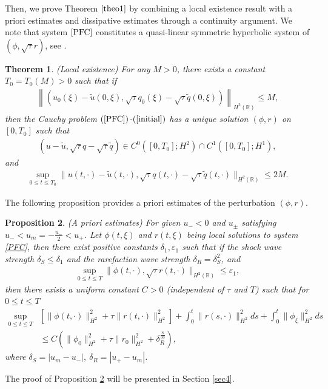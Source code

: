 \documentclass[10pt,reqno]{amsart}
\numberwithin{equation}{section}
\newtheorem{theorem}{Theorem}[section]
\newtheorem{proposition}[theorem]{Proposition}
\begin{document}
	Then, we prove Theorem $\ref{theo1}$ by combining a local existence result with a priori estimates and dissipative estimates through a continuity argument. We note that system $\eqref{PFC}$ constitutes a quasi-linear symmetric hyperbolic system of $\left(\phi,\sqrt{\tau}r\right)$, see \cite{ref40}.
	\begin{theorem}\label{local}
		 (Local existence)
		For any $M>0$, there exists a constant $T_0=T_0(M)>0$ such that if
		\begin{align*}
			\left\lVert\left(u_0(\xi)-\tilde{u}(0,\xi), \sqrt{\tau}q_0(\xi)-\sqrt{\tau}\tilde{q}(0,\xi)\right)\right\rVert_{H^2(\mathbb{R})} \leq M,
		\end{align*}
		then the Cauchy problem $(\ref{PFC})$-$(\ref{initial})$ has a unique solution $(\phi,r)$ on $[0,T_0]$ such that 
		\begin{align*}
			\left(u-\tilde{u}, \sqrt{\tau}q-\sqrt{\tau}\tilde{q}\right)\in C^0\left([0,T_0];H^2\right)\cap C^1\left([0,T_0];H^1\right),
		\end{align*}
		and
		\begin{align*}
			\sup_{0\leq t\leq T_0} \|u(t,\cdot)-\tilde{u}(t,\cdot), \sqrt{\tau}q(t,\cdot)-\sqrt{\tau}\tilde{q}(t,\cdot)\|_{H^2(\mathbb{R})} \leq 2M.
		\end{align*}
	\end{theorem}
	The following proposition provides a priori estimates of the perturbation $(\phi,r)$.
	\begin{proposition}\label{p1}
		(A priori estimates)
		For given $u_{-}<0$ and $u_{\pm}$ satisfying $u_{-}<u_m=-\frac{u_{-}}{2}<u_{+}$. Let $\phi(t,\xi)$ and $r(t,\xi)$ being local solutions to system \eqref{PFC}, then there exist positive constants $\delta_{1},\varepsilon_{1}$ such that if the shock wave strength $\delta_{S}\leq \delta_{1}$ and the rarefaction wave strength $\delta_{R}=\delta_S^2$, and 
		\begin{equation}\label{js}
			\begin{aligned}
				\sup_{0\leq t\leq T} \|\phi(t,\cdot), \sqrt{\tau}r(t,\cdot)\|_{H^2(\mathbb{R})} \leq \varepsilon_1,
			\end{aligned} 
		\end{equation}
		then there exists a uniform constant $C>0$ (independent of $\tau$ and $T$) such that for $0\leq t\leq T$ 
		\begin{equation} 
			\begin{aligned}
				\sup_{0\leq t\leq T}&\left[\|\phi(t, \cdot)\|_{H^{2}}^2+ \tau\|r(t, \cdot)\|_{H^{2}}^2\right]+ \int_0^t \|r(s, \cdot)\|_{H^{2}}^2 ds + \int_0^t\|\phi_{\xi}\|_{H^2}^2 ds \\
				&\leq C \left(\|\phi_0\|_{H^2}^2+\tau\|r_0\|_{H^2}^2 +\delta_R^{\frac{8}{33}}\right),
			\end{aligned}
		\end{equation}
		where $\delta_S=|u_m-u_-|,\ \delta_{R}=|u_+-u_m|$. 
	\end{proposition}
	The proof of Proposition \ref{p1} will be presented in Section \ref{sec4}.
	
\end{document}
